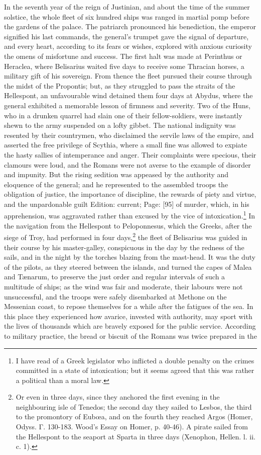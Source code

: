 In the seventh year of the reign of Justinian, and about the time of the summer solstice, the whole fleet of six hundred ships was ranged in martial pomp before the gardens of the palace. The patriarch pronounced his benediction, the emperor signified his last commands, the general\texthebrew{}’s trumpet gave the signal of departure, and every heart, according to its fears or wishes, explored with anxious curiosity the omens of misfortune and success. The first halt was made at Perinthus or Heraclea, where Belisarius waited five days to receive some Thracian horses, a military gift of his sovereign. From thence the fleet pursued their course through the midst of the Propontis; but, as they struggled to pass the straits of the Hellespont, an unfavourable wind detained them four days at Abydus, where the general exhibited a memorable lesson of firmness and severity. Two of the Huns, who in a drunken quarrel had slain one of their fellow-soldiers, were instantly shewn to the army suspended on a lofty gibbet. The national indignity was resented by their countrymen, who disclaimed the servile laws of the empire, and asserted the free privilege of Scythia, where a small fine was allowed to expiate the hasty sallies of intemperance and anger. Their complaints were specious, their clamours were loud, and the Romans were not averse to the example of disorder and impunity. But the rising sedition was appeased by the authority and eloquence of the general; and he represented to the assembled troops the obligation of justice, the importance of discipline, the rewards of piety and virtue, and the unpardonable guilt Edition: current; Page: [95] of murder, which, in his apprehension, was aggravated rather than excused by the vice of intoxication.\footnote{I have read of a Greek legislator who inflicted a double penalty on the crimes committed in a state of intoxication; but it seems agreed that this was rather a political than a moral law.} In the navigation from the Hellespont to Peloponnesus, which the Greeks, after the siege of Troy, had performed in four days,\footnote{Or even in three days, since they anchored the first evening in the neighbouring isle of Tenedos; the second day they sailed to Lesbos, the third to the promontory of Eubœa, and on the fourth they reached Argos (Homer, Odyss. \textgreek{Γ}. 130-183. Wood\texthebrew{}’s Essay on Homer, p. 40-46). A pirate sailed from the Hellespont to the seaport at Sparta in three days (Xenophon, Hellen. l. ii. c. 1).} the fleet of Belisarius was guided in their course by his master-galley, conspicuous in the day by the redness of the sails, and in the night by the torches blazing from the mast-head. It was the duty of the pilots, as they steered between the islands, and turned the capes of Malea and Tænarum, to preserve the just order and regular intervals of such a multitude of ships; as the wind was fair and moderate, their labours were not unsuccessful, and the troops were safely disembarked at Methone on the Messenian coast, to repose themselves for a while after the fatigues of the sea. In this place they experienced how avarice, invested with authority, may sport with the lives of thousands which are bravely exposed for the public service. According to military practice, the bread or biscuit of the Romans was twice prepared in the 